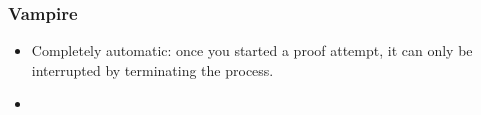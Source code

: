                                
                      \begin{frame}
                 \frametitle{Vampire}


\begin{itemize}
\item \alert{Completely automatic:} once you started a proof attempt,
  it can only be interrupted by terminating the process.\\[1em]


\item {}
\end{itemize}

                               \end{frame}

                               
                                
